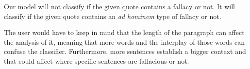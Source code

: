 \documentclass[a4paper]{article}
\begin{document}
Our model will not classify if the given quote contains a fallacy or not. It will classify if the given quote contains an \emph{ad hominem} type of fallacy or not.

The user would have to keep in mind that the length of the paragraph can affect the analysis of it, meaning that more words and the interplay of those words can confuse the classifier. Furthermore, more sentences establish a bigger context and that could affect where specific sentences are fallacious or not.



\end{document}
